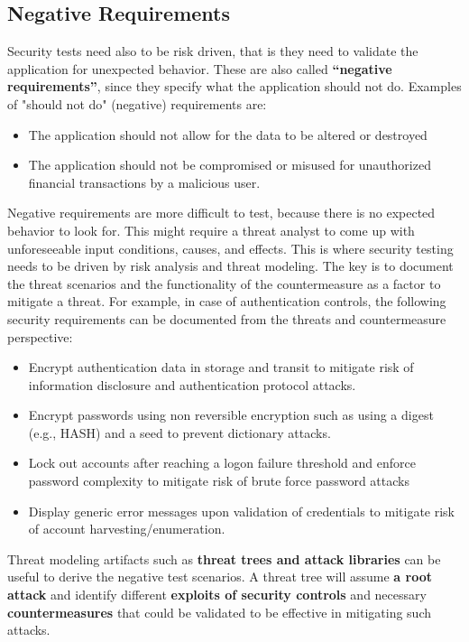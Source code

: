 		\subsection{Negative Requirements}
			Security tests need also to be risk driven, that is they need to validate the application for 
			unexpected behavior. These are also called {\bf “negative requirements”}, since they specify 
			what the application should not do. Examples of "should not do" (negative) requirements are:
				\begin{itemize}
					\item The application should not allow for the data to be altered or destroyed
					\item The application should not be compromised or misused for unauthorized financial 
					transactions by a malicious user.
				\end{itemize}

			Negative requirements are more difficult to test, because there is no expected behavior to look for. 
			This might require a threat analyst to come up with unforeseeable input conditions, causes, and 
			effects. This is where security testing needs to be driven by risk analysis and threat modeling. 
			The key is to document the threat scenarios and the functionality of the countermeasure as a factor 
			to mitigate a threat. For example, in case of authentication controls, the following security
			requirements can be documented from the threats and countermeasure perspective:

				\begin{itemize}
					\item Encrypt authentication data in storage and transit to mitigate risk of information
					disclosure and authentication protocol attacks.
					\item Encrypt passwords using non reversible encryption such as using a digest (e.g., HASH) 
					and a seed to prevent dictionary attacks.
					\item Lock out accounts after reaching a logon failure threshold and enforce password 
					complexity to mitigate risk of brute force password attacks
					\item Display generic error messages upon validation of credentials to mitigate risk 
					of account harvesting/enumeration.
				\end{itemize}

			Threat modeling artifacts such as {\bf threat trees and attack libraries} can be useful to derive the 
			negative test scenarios. A threat tree will assume {\bf a root attack} and identify different
			{\bf exploits of security controls} and necessary {\bf countermeasures} that could be validated to 
			be effective in mitigating such attacks.

